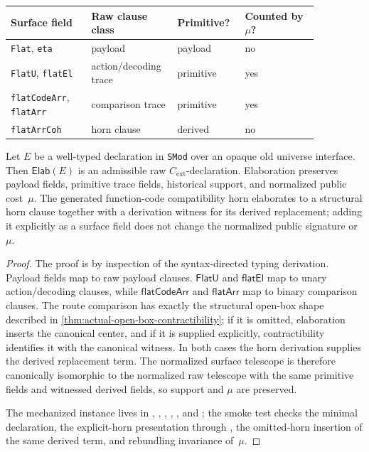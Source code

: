 \documentclass{lmcs}
\newcommand{\Cext}{C_{\mathrm{ext}}}
\begin{document}
\begin{center}
\small
\begin{tabular}{@{}p{0.24\linewidth}p{0.22\linewidth}p{0.18\linewidth}p{0.22\linewidth}@{}}
\toprule
Surface field & Raw clause class & Primitive? & Counted by $\mu$? \\
\midrule
\texttt{Flat}, \texttt{eta} & payload & payload & no \\
\texttt{FlatU}, \texttt{flatEl} & action/decoding trace & primitive & yes \\
\texttt{flatCodeArr}, \texttt{flatArr} & comparison trace & primitive & yes \\
\texttt{flatArrCoh} & horn clause & derived & no \\
\bottomrule
\end{tabular}
\end{center}

\begin{thm}
\label{thm:modal-surface-adequacy}
Let $E$ be a well-typed declaration in \texttt{SMod} over an opaque old
universe interface. Then \(\mathsf{Elab}(E)\) is an admissible raw
\(\Cext\)-declaration. Elaboration preserves payload fields, primitive trace
fields, historical support, and normalized public cost~\(\mu\). The generated
function-code compatibility horn elaborates to a structural horn clause
together with a derivation witness for its derived replacement; adding it
explicitly as a surface field does not change the normalized public signature
or~\(\mu\).
\end{thm}

\begin{proof}
The proof is by inspection of the syntax-directed typing derivation. Payload
fields map to raw payload clauses. \(\mathsf{FlatU}\) and
\(\mathsf{flatEl}\) map to unary action/decoding clauses, while
\(\mathsf{flatCodeArr}\) and \(\mathsf{flatArr}\) map to binary comparison
clauses. The route comparison has exactly the structural open-box shape
described in \autoref{thm:actual-open-box-contractibility}; if it is omitted,
elaboration inserts the canonical center, and if it is supplied explicitly,
contractibility identifies it with the canonical witness. In both cases the
horn derivation supplies the derived replacement term. The normalized surface
telescope is therefore canonically isomorphic to the normalized raw telescope
with the same primitive fields and witnessed derived fields, so support and
\(\mu\) are preserved.

The mechanized instance lives in
,
,
,
,
, and
; the smoke test
 checks the minimal
declaration, the explicit-horn presentation through
, the
omitted-horn insertion of the same derived term, and rebundling invariance
of~\(\mu\).
\end{proof}
\end{document}
